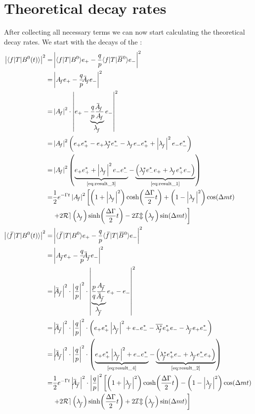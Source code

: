 \section{Theoretical decay rates}

After collecting all necessary terms we can now start calculating the theoretical decay rates. We start with the decays of the \Bz:
\begin{align}
  \left|\bra{f} T \ket{\Bz(t)}\right|^2 =& \left| \bra{f} T \ket{\Bz} e_+ - \frac{q}{p} \bra{f} T \ket{\Bzb}e_-\right|^2\nonumber\\
  =&\left|\Af e_+-\frac{q}{p}\Abarf e_-\right|^2\nonumber\\
  =&\left|\Af\right|^2\cdot\left|e_+-\underbrace{\frac{q}{p}\frac{\Abarf }{\Af}}_{\Lf}e_-\right|^2\nonumber\\
  =&\left|\Af\right|^2\left( e_+e_+^* - e_+\Lfst e_-^*-\Lf e_-e_+^*+\left|\Lf\right|^2e_-e_-^*\right)\nonumber\\
  =&\left|\Af\right|^2\left(\underbrace{e_+e_+^* + \left|\Lf\right|^2e_-e_-^*}_{\text{\cref{eq:result_3}}}
  -\underbrace{\left(\Lfst e_-^*e_+ + \Lf e_+^*e_-\right)}_{\text{\cref{eq:result_1}}}\right)\nonumber\\
  =&\frac{1}{2}e^{-\Gamma t}\left|\Af\right|^2\left[\left(1+\left|\Lf\right|^2\right)\cosh\!\left(\frac{\Delta\Gamma}{2}t\right)
  +\left(1-\left|\Lf\right|^2\right)\cos\!\left(\Delta mt\right)\right.\nonumber\\
  &\left.+2\mathcal{Re}\left(\Lf\right)\sinh\!\left(\frac{\Delta\Gamma}{2}t\right)-2\mathcal{Im}\left(\Lf\right)\sin\!\left(\Delta mt\right)\right]\\
  \left|\bra{\fbar}T\ket{\Bz(t)}\right|^2 =& \left|\bra{\fbar}T\ket{\Bz}e_+-\frac{q}{p}\bra{\fbar}T\ket{\Bzb}e_-\right|^2\nonumber\\
  =&\left|\Afbar e_+ -\frac{q}{p}\Abarfbar e_-\right|^2\nonumber\\
  =&\left| \Abarfbar  \right|^2 \cdot \left| \frac{q}{p} \right|^2 \cdot
  \left| \underbrace{\frac{p}{q}\frac{ \Afbar }{\Abarfbar }}_{\Lfbar }e_+ - e_-\right|^2\nonumber\\
  =& \left|\Abarfbar \right|^2\cdot\left|\frac{q}{p}\right|^2\cdot\left( e_+e_+^*\left|\Lfbar \right|^2 +e_-e_-^*
  - \overline{\Lfst }e_+^*e_- -\Lfbar e_+e_-^*\right)\nonumber\\
  =& \left|\Abarfbar \right|^2\cdot\left|\frac{q}{p}\right|^2\cdot\left(\underbrace{e_+e_+^*\left|\Lfbar \right|^2 + e_-e_-^*}_{\text{\cref{eq:result_4}}}
  -\underbrace{\left(\Lfbarst e_+^*e_- + \Lfbar  e_-^*e_+\right)}_{\text{\cref{eq:result_2}}}\right)\nonumber\\
  =& \frac{1}{2}e^{-\Gamma t} \left|\Abarfbar \right|^2\cdot\left|\frac{q}{p}\right|^2\left[\left(1+\left|\Lfbar \right|^2\right)
  \cosh\!\left(\frac{\Delta\Gamma}{2}t\right)-\left(1-\left|\Lfbar \right|^2\right)\cos\!\left(\Delta mt\right)\right.\nonumber\\
  &\left.+2\mathcal{Re}\left(\Lfbar \right)\sinh\!\left(\frac{\Delta\Gamma}{2}t\right)
  +2\mathcal{Im}\left(\Lfbar \right)\sin\!\left(\Delta mt\right)\right]
\end{align}
